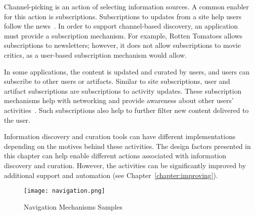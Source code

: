 {{{Channel-picking is an action of selecting information sources. A common enabler for this action is subscriptions. Subscriptions to updates from a site help users follow the news~\cite{java2007feeds}. In order to support channel-based discovery, an application must provide a subscription mechanism. For example, Rotten Tomatoes allows subscriptions to newsletters; however, it does not allow subscriptions to movie critics, as a user-based subscription mechanism would allow. 

In some applications, the content is updated and curated by users, and users can subscribe to other users or artifacts. Similar to site subscriptions, user and artifact subscriptions are subscriptions to activity updates. These subscription mechanisms help with networking and provide awareness about other users' activities~\cite{millen2005social}. Such subscriptions also help to further filter new content delivered to the user. 
} %
} %

Information discovery and curation tools can have different implementations depending on the motives behind these activities. The design factors presented in this chapter can help enable different actions associated with information discovery and curation. However, the activities can be significantly improved by additional support and automation (see Chapter~\ref{chapter:improving}).
} %

\begin{figure}[ht!]
	\noindent
	\centering
	\texttt{[image: navigation.png]}
	\caption{Navigation Mechanisms Samples}
	\label{fig:navigation_samples} 
\end{figure}








